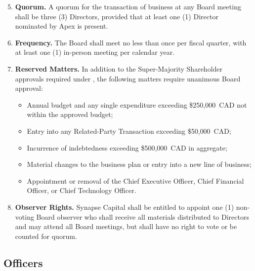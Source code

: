 \begin{enumerate}[leftmargin=*, label=\textbf{4.\arabic*.}, itemsep=5pt]
  \setcounter{enumi}{4}
  \item \textbf{Quorum.}  A quorum for the transaction of business at any Board
        meeting shall be three (3) Directors, provided that at least one (1) Director
        nominated by Apex is present.

  \item \textbf{Frequency.}  The Board shall meet no less than once per fiscal
        quarter, with at least one (1) in-person meeting per calendar year.

  \item \textbf{Reserved Matters.}  In addition to the Super-Majority Shareholder
        approvals required under , the following matters require
        unanimous Board approval:
        \begin{itemize}[itemsep=2pt]
          \item Annual budget and any single expenditure exceeding
                \$250{,}000~CAD not within the approved budget;
          \item Entry into any Related-Party Transaction exceeding \$50{,}000~CAD;
          \item Incurrence of indebtedness exceeding \$500{,}000~CAD in aggregate;
          \item Material changes to the business plan or entry into a new line of
                business;
          \item Appointment or removal of the Chief Executive Officer, Chief
                Financial Officer, or Chief Technology Officer.
        \end{itemize}

  \item \textbf{Observer Rights.}  Synapse Capital shall be entitled to appoint
        one (1) non-voting Board observer who shall receive all materials
        distributed to Directors and may attend all Board meetings, but shall have
        no right to vote or be counted for quorum.
\end{enumerate}

\subsection{Officers}

